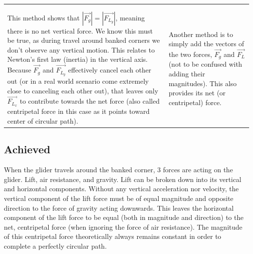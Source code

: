 \documentclass[11pt, a4paper]{article}
\begin{document}
\begin{table}[H]
\begin{tabularx}{\textwidth}{X|X}
{\begin{align}
				\end{align}
			}\\
			This method shows that $|\vec{F_g}|=|\vec{F_{L_y}}|$, meaning there is no net vertical force. We know this must be true, as during travel around banked corners we don't observe any vertical motion. This relates to Newton's first law (inertia) in the vertical axis.
			Because $\vec{F_g}$ and $\vec{F_{L_y}}$ effectively cancel each other out (or in a real world scenario come extremely close to canceling each other out), that leaves only $\vec{F_{L_x}}$ to contribute towards the net force (also called centripetal force in this case as it points toward center of circular path).
			&
			Another method is to simply add the vectors of the two forces, $\vec{F_g}$ and $\vec{F_L}$ (not to be confused with adding their magnitudes). This also provides its net (or centripetal) force.\\
		\end{tabularx}
	\end{table}
	
	\subsection{Achieved}
	
	When the glider travels around the banked corner, 3 forces are acting on the glider. Lift, air resistance, and gravity. Lift can be broken down into its vertical and horizontal components. Without any vertical acceleration nor velocity, the vertical component of the lift force must be of equal magnitude and opposite direction to the force of gravity acting downwards. This leaves the horizontal component of the lift force to be equal (both in magnitude and direction) to the net, centripetal force (when ignoring the force of air resistance). The magnitude of this centripetal force theoretically always remains constant in order to complete a perfectly circular path.
\end{document}
